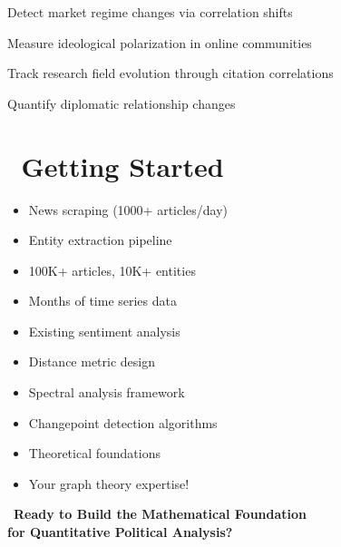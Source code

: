 \documentclass[11pt]{article}
\begin{document}
\begin{tcolorbox}[colback=purple!15, colframe=purple, title=\faIndustry \, Applications Across Domains, fonttitle=\bfseries]
\begin{description}[leftmargin=3em]
    \item[\faChartLine \, Financial Networks] Detect market regime changes via correlation shifts
    \item[\faUsers \, Social Networks] Measure ideological polarization in online communities
    \item[\faFlask \, Scientific Collaboration] Track research field evolution through citation correlations  
    \item[\faGlobeAmericas \, International Relations] Quantify diplomatic relationship changes
\end{description}
\end{tcolorbox}

\section{\faRoadmap \, Getting Started}

\begin{minipage}{0.48\textwidth}
\begin{tcolorbox}[colback=darkgreen!20, colframe=darkgreen, title=\faCheck \, We Have]
\begin{itemize}[label=\textcolor{darkgreen}{\faCheckCircle}]
    \item News scraping (1000+ articles/day)
    \item Entity extraction pipeline  
    \item 100K+ articles, 10K+ entities
    \item Months of time series data
    \item Existing sentiment analysis
\end{itemize}
\end{tcolorbox}
\end{minipage}
\hfill
\begin{minipage}{0.48\textwidth}
\begin{tcolorbox}[colback=orange!20, colframe=orange, title=\faStar \, We Need]
\begin{itemize}[label=\textcolor{orange}{\faStar}]
    \item Distance metric design
    \item Spectral analysis framework
    \item Changepoint detection algorithms
    \item Theoretical foundations
    \item Your graph theory expertise!
\end{itemize}
\end{tcolorbox}
\end{minipage}

\vspace{1em}

\begin{center}
\begin{tcolorbox}[colback=darkblue!90, coltext=white, halign=center, arc=3mm, boxrule=0pt, width=0.8\textwidth]
\Large \faHandshake \, \textbf{Ready to Build the Mathematical Foundation} \\
\textbf{for Quantitative Political Analysis?}
\end{tcolorbox}
\end{center}
\end{document}
